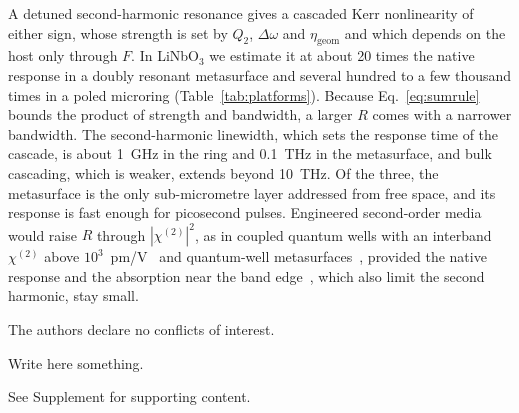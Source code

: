 \documentclass{optica-article}
\newcommand{\chitwo}{\chi^{(2)}}
\newcommand{\Dom}{\Delta\omega}
\newcommand{\etag}{\eta_{\mathrm{geom}}}
\begin{document}
A detuned second-harmonic resonance gives a cascaded Kerr nonlinearity of
either sign, whose strength is set by $Q_2$, $\Dom$ and $\etag$ and which
depends on the host only through $F$.  In LiNbO$_3$ we estimate it at about 20 times the
native response in a doubly resonant metasurface and several hundred to a
few thousand times in a poled microring (Table~\ref{tab:platforms}).
Because Eq.~\eqref{eq:sumrule} bounds the product of strength and
bandwidth, a larger $R$ comes with a narrower bandwidth.  The
second-harmonic linewidth, which sets the response time of the cascade, is
about 1~GHz in the ring and 0.1~THz in the metasurface, and bulk cascading,
which is weaker, extends beyond 10~THz.  Of the three, the metasurface is
the only sub-micrometre layer addressed from free space, and its response
is fast enough for picosecond pulses.
Engineered second-order media would raise $R$ through
$|\chitwo|^2$, as in coupled quantum wells with an interband $\chitwo$ above
$10^3$~pm/V~\cite{ramesh2026} and quantum-well
metasurfaces~\cite{fathi2026}, provided the native response and the
absorption near the band edge~\cite{sheikbahae1991}, which also limit the
second harmonic, stay small.

\begin{backmatter}

The authors declare no conflicts of interest.

Write here something.

See Supplement for supporting content.
\end{backmatter}


\end{document}
